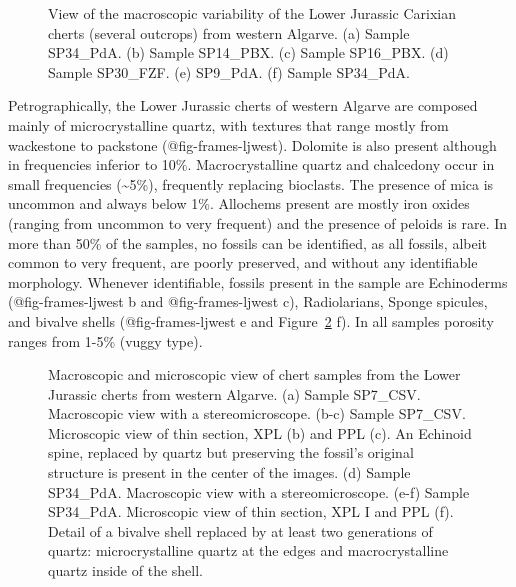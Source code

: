 \documentclass[
  a4paper,
  DIV=11,
  numbers=noendperiod]{scrreprt}
\begin{document}
\begin{figure}


\caption{\label{fig-frames-ljmacro}View of the macroscopic variability
of the Lower Jurassic Carixian cherts (several outcrops) from western
Algarve. (a) Sample SP34\_PdA. (b) Sample SP14\_PBX. (c) Sample
SP16\_PBX. (d) Sample SP30\_FZF. (e) SP9\_PdA. (f) Sample SP34\_PdA.}

\end{figure}%

Petrographically, the Lower Jurassic cherts of western Algarve are
composed mainly of microcrystalline quartz, with textures that range
mostly from wackestone to packstone (@fig-frames-ljwest). Dolomite is
also present although in frequencies inferior to 10\%. Macrocrystalline
quartz and chalcedony occur in small frequencies (\textasciitilde5\%),
frequently replacing bioclasts. The presence of mica is uncommon and
always below 1\%. Allochems present are mostly iron oxides (ranging from
uncommon to very frequent) and the presence of peloids is rare. In more
than 50\% of the samples, no fossils can be identified, as all fossils,
albeit common to very frequent, are poorly preserved, and without any
identifiable morphology. Whenever identifiable, fossils present in the
sample are Echinoderms (@fig-frames-ljwest b and @fig-frames-ljwest c),
Radiolarians, Sponge spicules, and bivalve shells (@fig-frames-ljwest e
and Figure~\ref{fig-frames-ljwest} f). In all samples porosity ranges
from 1-5\% (vuggy type).

\begin{figure}


\caption{\label{fig-frames-ljwest}Macroscopic and microscopic view of
chert samples from the Lower Jurassic cherts from western Algarve. (a)
Sample SP7\_CSV. Macroscopic view with a stereomicroscope. (b-c) Sample
SP7\_CSV. Microscopic view of thin section, XPL (b) and PPL (c). An
Echinoid spine, replaced by quartz but preserving the fossil's original
structure is present in the center of the images. (d) Sample SP34\_PdA.
Macroscopic view with a stereomicroscope. (e-f) Sample SP34\_PdA.
Microscopic view of thin section, XPL I and PPL (f). Detail of a bivalve
shell replaced by at least two generations of quartz: microcrystalline
quartz at the edges and macrocrystalline quartz inside of the shell.}

\end{figure}%
\end{document}
